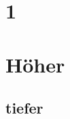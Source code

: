 \documentclass[twoside,a4paper,12pt]{report}
\begin{document}
\chapter{1}

\lipsum[1-3]

\chapter{Höher}
\section{tiefer}
\lipsum[1-20]
\end{document}
